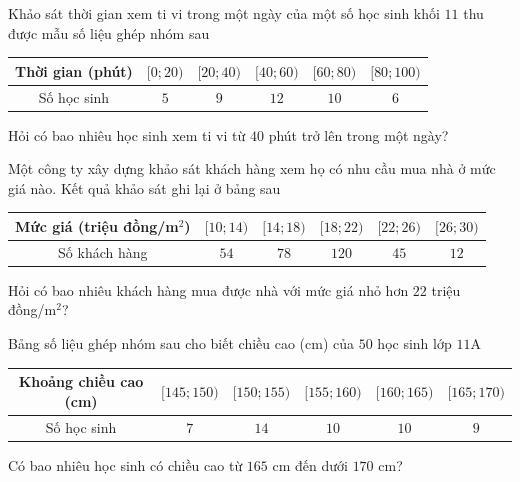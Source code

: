 
\begin{ex}%
	Khảo sát thời gian xem ti vi trong một ngày của một số học  sinh khối $11$ thu được mẫu số liệu ghép nhóm sau
	\begin{center}
		\begin{tabular}{|c|c|c|c|c|c|}
			 \hline
			Thời gian (phút) & $[0;20)$ & $[20;40)$ & $[40;60)$ & $[60;80)$ & $[80;100)$ \\ 
			 \hline
			Số học sinh & $5$ & $9$ & $12$ & $10$ &  $6$ \\
			 \hline
		\end{tabular}
	\end{center}
	Hỏi có bao nhiêu học sinh xem ti vi từ $40$ phút trở lên trong một ngày? 
\end{ex}

\begin{ex}%
	Một công ty xây dựng khảo sát khách hàng xem họ có nhu cầu mua  nhà ở mức giá nào. Kết quả khảo sát ghi lại ở bảng sau
	\begin{center}
		\begin{tabular}{|c|c|c|c|c|c|}
			\hline 
			Mức giá (triệu đồng/m$^2$) & $[10;14)$ & $[14;18)$ & $[18;22)$ & $[22;26)$ &  $[26;30)$ \\
			 \hline
			Số khách hàng & $54$ & $78$ & $120$ & $45$ & $12$ \\ 
			\hline 
		\end{tabular}
	\end{center}
	Hỏi có bao nhiêu khách hàng mua được nhà với mức giá nhỏ  hơn $22$ triệu đồng/m$^2$?
\end{ex}

\begin{ex}%
	Bảng số  liệu ghép nhóm sau cho biết chiều cao (cm) của $50$ học sinh lớp $11\text{A}$
	\begin{center}
		\begin{tabular}{|c|c|c|c|c|c|}
			\hline 
			Khoảng chiều cao (cm) & $[145;150)$ & $[150;155)$  & $[155;160)$ & $[160;165)$ & $[165;170)$ \\
			\hline 
			Số học  sinh & $7$ & $14$ & $10$ & $10$ & $9$ \\
			 \hline
		\end{tabular}
	\end{center}
	 Có bao nhiêu học sinh có chiều cao từ $165$ cm đến dưới $170$ cm?
\end{ex}

